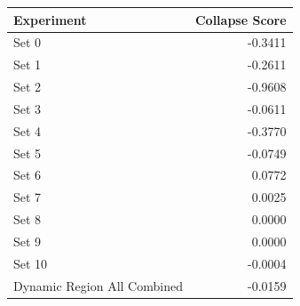 \begin{tabular}{lr}
\toprule
Experiment & Collapse Score \\
\midrule
Set 0 & -0.3411 \\
Set 1 & -0.2611 \\
Set 2 & -0.9608 \\
Set 3 & -0.0611 \\
Set 4 & -0.3770 \\
Set 5 & -0.0749 \\
Set 6 & 0.0772 \\
Set 7 & 0.0025 \\
Set 8 & 0.0000 \\
Set 9 & 0.0000 \\
Set 10 & -0.0004 \\
Dynamic Region All Combined & -0.0159 \\
\bottomrule
\end{tabular}
